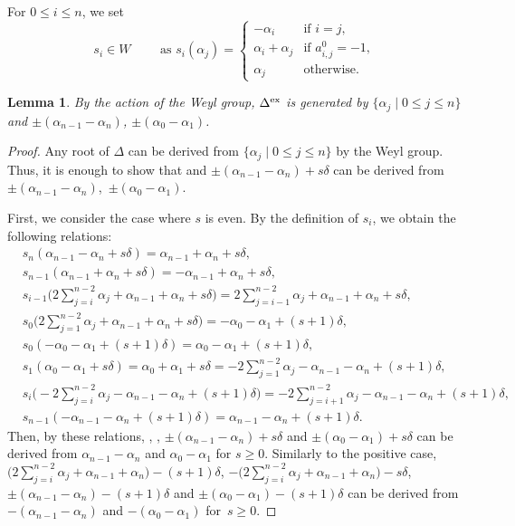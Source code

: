 \documentclass[10pt,a4paper]{amsart}
\numberwithin{equation}{section}
\newtheorem{Lemma}[Theorem]{Lemma}
\theoremstyle{definition}
\begin{document}
For $0\leq i\leq n$, we set
\[ s_i\in W \qquad \text{ as } s_i(\alpha_j)=\begin{cases}
-\alpha_i&\text{if }i=j,\\
\alpha_i+\alpha_j&\text{if }a^0_{i,j}=-1,\\
\alpha_j&\text{otherwise.}
\end{cases}
\]
\begin{Lemma}%
By the action of the Weyl group, $\Delta^{{\rm ex}}$ is generated by $\{\alpha_j\mid0\leq j\leq n\}$ and $\pm(\alpha_{n-1}-\alpha_n)$, $\pm(\alpha_0-\alpha_1)$.
\end{Lemma}
\begin{proof}
Any root of $\Delta$ can be derived from $\{\alpha_j\mid0\leq j\leq n\}$ by the Weyl group. Thus, it is enough to show that  and $\pm(\alpha_{n-1}-\alpha_n)+s\delta$ can be derived from~$\pm(\alpha_{n-1}-\alpha_n)$,~$\pm(\alpha_0-\alpha_1)$.

First, we consider the case where $s$ is even.
By the definition of $s_i$, we obtain the following relations:
\begin{align*}
&s_n(\alpha_{n-1}-\alpha_n+s\delta)=\alpha_{n-1}+\alpha_n+s\delta,\\
&s_{n-1}(\alpha_{n-1}+\alpha_n+s\delta)=-\alpha_{n-1}+\alpha_n+s\delta,\\
&s_{i-1}\Biggl(2\sum_{j=i}^{n-2}\alpha_j+\alpha_{n-1}+\alpha_n+s\delta\Biggr)=2\sum_{j=i-1}^{n-2}\alpha_j+\alpha_{n-1}+\alpha_n+s\delta,\\
&s_{0}\Biggl(2\sum_{j=1}^{n-2}\alpha_j+\alpha_{n-1}+\alpha_n+s\delta\Biggr)=-\alpha_{0}-\alpha_1+(s+1)\delta,\\
&s_0(-\alpha_{0}-\alpha_1+(s+1)\delta)=\alpha_{0}-\alpha_1+(s+1)\delta,\\
&s_1(\alpha_0-\alpha_1+s\delta)=\alpha_{0}+\alpha_1+s\delta=-2\sum_{j=1}^{n-2}\alpha_j-\alpha_{n-1}-\alpha_n+(s+1)\delta,\\
&s_{i}\Biggl(-2\sum_{j=i}^{n-2}\alpha_j-\alpha_{n-1}-\alpha_n+(s+1)\delta\Biggr)=-2\sum_{j=i+1}^{n-2}\alpha_j-\alpha_{n-1}-\alpha_n+(s+1)\delta,\\
&s_{n-1}(-\alpha_{n-1}-\alpha_n+(s+1)\delta)=\alpha_{n-1}-\alpha_n+(s+1)\delta.
\end{align*}
Then, by these relations, , , $\pm(\alpha_{n-1}-\alpha_n)+s\delta$ and $\pm(\alpha_0-\alpha_1)+s\delta$ can be derived from $\alpha_{n-1}-\alpha_n$ and $\alpha_0-\alpha_1$ for $s\geq0$.
Similarly to the positive case, $\bigl(2\sum_{j=i}^{n-2}\alpha_j+\alpha_{n-1}+\alpha_n\bigr)-(s+1)\delta$, $-\bigl(2\sum_{j=i}^{n-2}\alpha_j+\alpha_{n-1}+\alpha_n\bigr)-s\delta$, $\pm(\alpha_{n-1}-\alpha_n)-(s+1)\delta$ and $\pm(\alpha_0-\alpha_1)-(s+1)\delta$ can be derived from $-(\alpha_{n-1}-\alpha_n)$ and $-(\alpha_0-\alpha_1)$ for~${s\geq0}$.
\end{proof}
\end{document}
